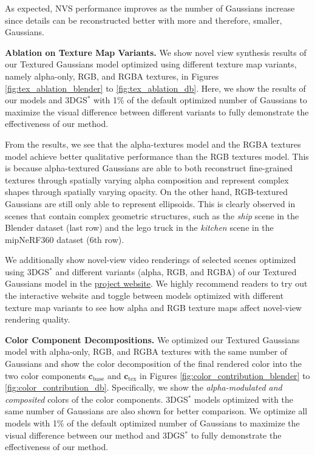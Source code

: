 As expected, NVS performance improves as the number of Gaussians increase since details can be reconstructed better with more and therefore, smaller, Gaussians.

\noindent \textbf{Ablation on Texture Map Variants. } We show novel view synthesis results of our Textured Gaussians model optimized using different texture map variants, namely alpha-only, RGB, and RGBA textures, in Figures \ref{fig:tex_ablation_blender} to \ref{fig:tex_ablation_db}. Here, we show the results of our models and 3DGS$^*$ with 1\% of the default optimized number of Gaussians to maximize the visual difference between different variants to fully demonstrate the effectiveness of our method.  

From the results, we see that the alpha-textures model and the RGBA textures model achieve better qualitative performance than the RGB textures model. This is because alpha-textured Gaussians are able to both reconstruct fine-grained textures through spatially varying alpha composition and represent complex shapes through spatially varying opacity. On the other hand, RGB-textured Gaussians are still only able to represent ellipsoids. This is clearly observed in scenes that contain complex geometric structures, such as the \textit{ship} scene in the Blender dataset (last row) and the lego truck in the \textit{kitchen} scene in the mipNeRF360 dataset (6th row).

We additionally show novel-view video renderings of selected scenes optimized using 3DGS$^*$ and different variants (alpha, RGB, and RGBA) of our Textured Gaussians model in the \href{https://textured-gaussians.github.io/}{project website}. We highly recommend readers to try out the interactive website and toggle between models optimized with different texture map variants to see how alpha and RGB texture maps affect novel-view rendering quality.

\noindent \textbf{Color Component Decompositions. } We optimized our Textured Gaussians model with alpha-only, RGB, and RGBA textures with the same number of Gaussians and show the color decomposition of the final rendered color into the two color components $\mathbf{c}_\text{base}$ and $\mathbf{c}_\text{tex}$ in Figures \ref{fig:color_contribution_blender} to \ref{fig:color_contribution_db}. Specifically, we show the \textit{alpha-modulated and composited} colors of the color components. 3DGS$^*$ models optimized with the same number of Gaussians are also shown for better comparison. We optimize all models with 1\% of the default optimized number of Gaussians to maximize the visual difference between our method and 3DGS$^*$ to fully demonstrate the effectiveness of our method. 

